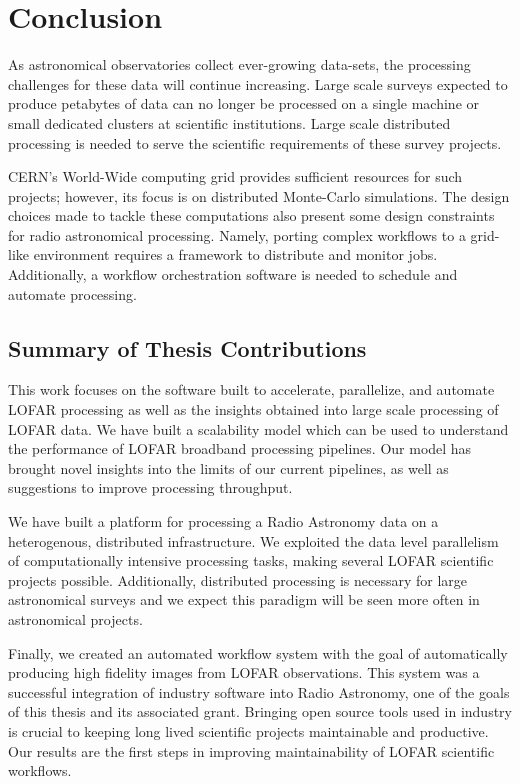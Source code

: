 \chapter{Conclusion}

\label{ch:conclusions}

As astronomical observatories collect ever-growing data-sets, the processing challenges for these data will continue increasing. Large scale surveys expected to produce petabytes of data can no longer be processed on a single machine or small dedicated clusters at scientific institutions. Large scale distributed processing is needed to serve the scientific requirements of these survey projects. 

CERN's World-Wide computing grid provides sufficient resources for such projects; however, its focus is on distributed Monte-Carlo simulations. The design choices made to tackle these computations also present some design constraints for radio astronomical processing. Namely, porting complex workflows to a grid-like environment requires a framework to distribute and monitor jobs. Additionally, a workflow orchestration software is needed to schedule and automate processing. 

\section{Summary of Thesis Contributions}

This work focuses on the software built to accelerate, parallelize, and automate LOFAR processing as well as the insights obtained into large scale processing of LOFAR data.  We have built a scalability model which can be used to understand the performance of LOFAR broadband processing pipelines. Our model has brought novel insights into the limits of our current pipelines, as well as suggestions to improve processing throughput. 

We have built a platform for processing a Radio Astronomy data on a heterogenous, distributed infrastructure. We exploited the data level parallelism of computationally intensive processing tasks, making several LOFAR scientific projects possible. Additionally, distributed processing is necessary for large astronomical surveys and we expect this paradigm will be seen more often in astronomical projects. 

Finally, we created an automated workflow system with the goal of  automatically producing high fidelity images from LOFAR observations. This system was a successful integration of industry software into Radio Astronomy, one of the goals of this thesis and its associated grant. Bringing open source tools used in industry is crucial to  keeping long lived scientific projects  maintainable and productive. Our results are the first steps in improving maintainability of LOFAR scientific workflows.  

